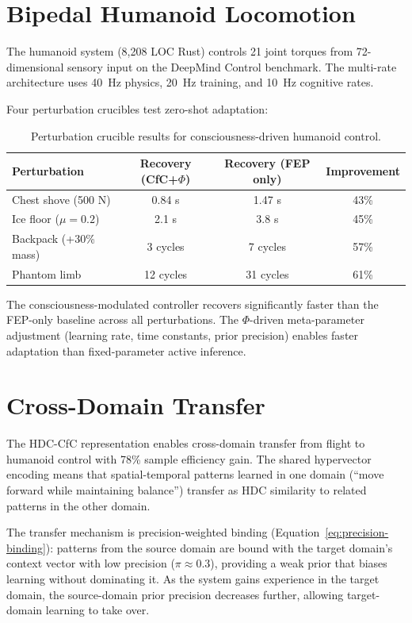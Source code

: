 \documentclass[12pt]{book}
\begin{document}
\section{Bipedal Humanoid Locomotion}

The humanoid system (8,208 LOC Rust) controls 21 joint torques from 72-dimensional sensory input on the DeepMind Control benchmark. The multi-rate architecture uses 40~Hz physics, 20~Hz training, and 10~Hz cognitive rates.

Four perturbation crucibles test zero-shot adaptation:

\begin{table}[H]
\centering
\caption{Perturbation crucible results for consciousness-driven humanoid control.}
\label{tab:perturbation}
\begin{tabular}{lccc}
\toprule
\textbf{Perturbation} & \textbf{Recovery (CfC+$\Phi$)} & \textbf{Recovery (FEP only)} & \textbf{Improvement} \\
\midrule
Chest shove (500 N) & 0.84 s & 1.47 s & 43\% \\
Ice floor ($\mu = 0.2$) & 2.1 s & 3.8 s & 45\% \\
Backpack (+30\% mass) & 3 cycles & 7 cycles & 57\% \\
Phantom limb & 12 cycles & 31 cycles & 61\% \\
\bottomrule
\end{tabular}
\end{table}

The consciousness-modulated controller recovers significantly faster than the FEP-only baseline across all perturbations. The $\Phi$-driven meta-parameter adjustment (learning rate, time constants, prior precision) enables faster adaptation than fixed-parameter active inference.

\section{Cross-Domain Transfer}

The HDC-CfC representation enables cross-domain transfer from flight to humanoid control with 78\% sample efficiency gain. The shared hypervector encoding means that spatial-temporal patterns learned in one domain (``move forward while maintaining balance'') transfer as HDC similarity to related patterns in the other domain.

The transfer mechanism is precision-weighted binding (Equation~\ref{eq:precision-binding}): patterns from the source domain are bound with the target domain's context vector with low precision ($\pi \approx 0.3$), providing a weak prior that biases learning without dominating it. As the system gains experience in the target domain, the source-domain prior precision decreases further, allowing target-domain learning to take over.
\end{document}

